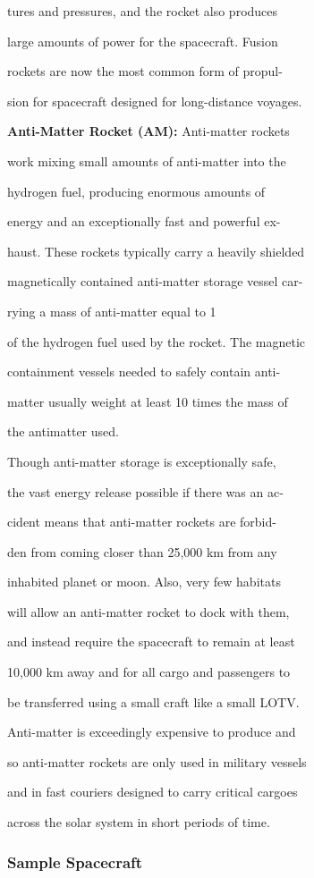 tures and pressures, and the rocket also produces 

large amounts of power for the spacecraft. Fusion 

rockets are now the most common form of propul-

sion for spacecraft designed for long-distance voyages.

\textbf{Anti-Matter Rocket (AM):} Anti-matter rockets 

work mixing small amounts of anti-matter into the 

hydrogen fuel, producing enormous amounts of 

energy and an exceptionally fast and powerful ex-

haust. These rockets typically carry a heavily shielded 

magnetically contained anti-matter storage vessel car-

rying a mass of anti-matter equal to 1%

of the hydrogen fuel used by the rocket. The magnetic 

containment vessels needed to safely contain anti-

matter usually weight at least 10 times the mass of 

the antimatter used.

Though anti-matter storage is exceptionally safe, 

the vast energy release possible if there was an ac-

cident means that anti-matter rockets are forbid-

den from coming closer than 25,000 km from any 

inhabited planet or moon. Also, very few habitats 

will allow an anti-matter rocket to dock with them, 

and instead require the spacecraft to remain at least 

10,000 km away and for all cargo and passengers to 

be transferred using a small craft like a small LOTV. 

Anti-matter is exceedingly expensive to produce and 

so anti-matter rockets are only used in military vessels 

and in fast couriers designed to carry critical cargoes 

across the solar system in short periods of time.

\subsubsection{Sample Spacecraft}


